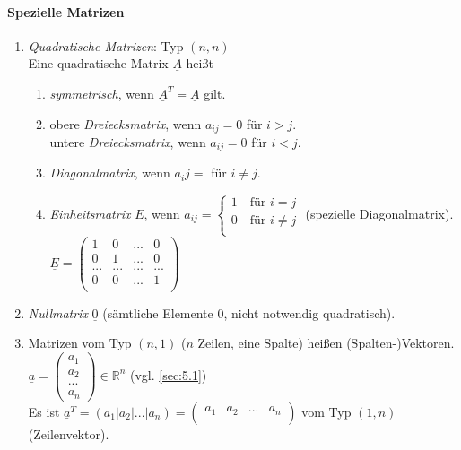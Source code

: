 \paragraph{Spezielle Matrizen}
\begin{enumerate}
\item \emph{Quadratische Matrizen}: Typ $(n,n)$\\
Eine quadratische Matrix $\underline{A}$ heißt
\begin{enumerate}
\item \emph{symmetrisch}, wenn $\underline{A}^T=\underline{A}$ gilt.
\item obere \emph{Dreiecksmatrix}, wenn $a_{ij}=0$ für $i>j$.\\
untere \emph{Dreiecksmatrix}, wenn $a_{ij}=0$ für $i<j$.
\item \emph{Diagonalmatrix}, wenn $a_ij=$ für $i\not = j$.
\item \emph{Einheitsmatrix} $\underline{E}$, wenn $a_{ij}=\begin{cases}
1 \quad \text{für }i=j\\
0 \quad \text{für } i \not = j\\
\end{cases}$ (spezielle Diagonalmatrix). \\
$\underline{E}=\begin{pmatrix}
1 & 0 & ... &0 \\
0 & 1 & ... &0 \\
... &... & ... & ...\\
0 & 0 & ... & 1 \\
\end{pmatrix}$
\end{enumerate}
\item \emph{Nullmatrix} $\underline{0}$ (sämtliche Elemente $0$, nicht notwendig quadratisch).
\item Matrizen vom Typ $(n,1)$ ($n$ Zeilen, eine Spalte) heißen (Spalten-)Vektoren.\\
$\underline{a}=\begin{pmatrix}
a_1\\
a_2\\
...\\
a_n
\end{pmatrix} \in \mathbb{R}^n$ (vgl. \ref{sec:5.1})\\
Es ist $\underline{a}^T=(a_1| a _2 | ... | a_n)=\begin{pmatrix}
a_1 & a_2 & ... & a_n\\
\end{pmatrix}$ vom Typ $(1,n)$ (Zeilenvektor).
\end{enumerate}
